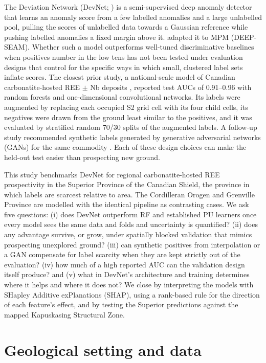\documentclass[pdflatex,sn-apa]{sn-jnl}
\begin{document}
The Deviation Network (DevNet; \citealp{Pang2019}) is a semi-supervised deep anomaly detector that learns an anomaly score from a few labelled anomalies and a large unlabelled pool, pulling the scores of unlabelled data towards a Gaussian reference while pushing labelled anomalies a fixed margin above it. \citet{Luo2026} adapted it to MPM (DEEP-SEAM). Whether such a model outperforms well-tuned discriminative baselines when positives number in the low tens has not been tested under evaluation designs that control for the specific ways in which small, clustered label sets inflate scores. The closest prior study, a national-scale model of Canadian carbonatite-hosted REE $\pm$ Nb deposits \citep{Parsa2024}, reported test AUCs of 0.91--0.96 with random forests and one-dimensional convolutional networks. Its labels were augmented by replacing each occupied S2 grid cell with its four child cells, its negatives were drawn from the ground least similar to the positives, and it was evaluated by stratified random 70/30 splits of the augmented labels. A follow-up study recommended synthetic labels generated by generative adversarial networks (GANs) for the same commodity \citep{Parsa2025}. Each of these design choices can make the held-out test easier than prospecting new ground.

This study benchmarks DevNet for regional carbonatite-hosted REE prospectivity in the Superior Province of the Canadian Shield, the province in which labels are scarcest relative to area. The Cordilleran Orogen and Grenville Province are modelled with the identical pipeline as contrasting cases. We ask five questions: (i) does DevNet outperform RF and established PU learners once every model sees the same data and folds and uncertainty is quantified? (ii) does any advantage survive, or grow, under spatially blocked validation that mimics prospecting unexplored ground? (iii) can synthetic positives from interpolation or a GAN compensate for label scarcity when they are kept strictly out of the evaluation? (iv) how much of a high reported AUC can the validation design itself produce? and (v) what in DevNet's architecture and training determines where it helps and where it does not? We close by interpreting the models with SHapley Additive exPlanations (SHAP), using a rank-based rule for the direction of each feature's effect, and by testing the Superior predictions against the mapped Kapuskasing Structural Zone.

\section{Geological setting and data}\label{sec:data}
\end{document}
